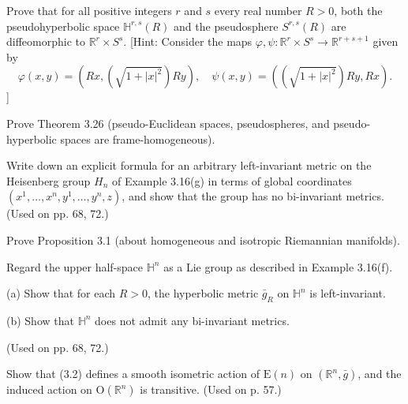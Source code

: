 \begin{exercise}
\label{prob:diffeomorphism-pseudohyperbolic-pseudosphere}
Prove that for all positive integers $r$ and $s$ every real number $R > 0$, both the pseudohyperbolic space $\mathbb{H}^{r,s}(R)$ and the pseudosphere $S^{r,s}(R)$ are diffeomorphic to $\mathbb{R}^r \times S^s$. [Hint: Consider the maps $\varphi, \psi : \mathbb{R}^r \times S^s \to \mathbb{R}^{r+s+1}$ given by
\[
\varphi(x,y) = \left(Rx, \left(\sqrt{1 + |x|^2}\right) Ry\right), \quad \psi(x,y) = \left(\left(\sqrt{1 + |x|^2}\right) Ry, Rx\right).
\]
]
\end{exercise}

\begin{exercise}
\label{prob:frame-homogeneity-pseudo-spaces}
Prove Theorem 3.26 (pseudo-Euclidean spaces, pseudospheres, and pseudo-hyperbolic spaces are frame-homogeneous).
\end{exercise}

\begin{exercise}
\label{prob:heisenberg-group-metrics}
Write down an explicit formula for an arbitrary left-invariant metric on the Heisenberg group $H_n$ of Example 3.16(g) in terms of global coordinates $(x^1, \ldots, x^n, y^1, \ldots, y^n, z)$, and show that the group has no bi-invariant metrics. (Used on pp. 68, 72.)
\end{exercise}

\begin{exercise}\label{prob:homogeneous-isotropic-riemannian}
Prove Proposition 3.1 (about homogeneous and isotropic Riemannian manifolds).
\end{exercise}

\begin{exercise}
\label{prob:hyperbolic-space-metrics}
Regard the upper half-space $\mathbb{H}^n$ as a Lie group as described in Example 3.16(f).

(a) Show that for each $R > 0$, the hyperbolic metric $\bar{g}_R$ on $\mathbb{H}^n$ is left-invariant.

(b) Show that $\mathbb{H}^n$ does not admit any bi-invariant metrics.

(Used on pp. 68, 72.)
\end{exercise}

\begin{exercise}\label{prob:isometric-action-e-n}
Show that (3.2) defines a smooth isometric action of $\text{E}(n)$ on $(\mathbb{R}^n,\bar{g})$, and the induced action on $\text{O}(\mathbb{R}^n)$ is transitive. (Used on p. 57.)
\end{exercise}

